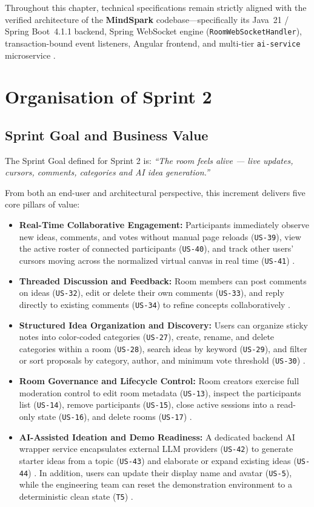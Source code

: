 Throughout this chapter, technical specifications remain strictly aligned with the verified architecture of the \textbf{MindSpark} codebase—specifically its Java~21 / Spring Boot~4.1.1 backend, Spring WebSocket engine (\texttt{RoomWebSocketHandler}), transaction-bound event listeners, Angular frontend, and multi-tier \texttt{ai-service} microservice \cite{backlog}.

\section{Organisation of Sprint 2}

\subsection{Sprint Goal and Business Value}

The Sprint Goal defined for Sprint 2 is: \emph{``The room feels alive — live updates, cursors, comments, categories and AI idea generation.''} \cite{backlog}

From both an end-user and architectural perspective, this increment delivers five core pillars of value:
\begin{itemize}
    \item \textbf{Real-Time Collaborative Engagement:} Participants immediately observe new ideas, comments, and votes without manual page reloads (\texttt{US-39}), view the active roster of connected participants (\texttt{US-40}), and track other users' cursors moving across the normalized virtual canvas in real time (\texttt{US-41}) \cite{backlog}.
    \item \textbf{Threaded Discussion and Feedback:} Room members can post comments on ideas (\texttt{US-32}), edit or delete their own comments (\texttt{US-33}), and reply directly to existing comments (\texttt{US-34}) to refine concepts collaboratively \cite{backlog}.
    \item \textbf{Structured Idea Organization and Discovery:} Users can organize sticky notes into color-coded categories (\texttt{US-27}), create, rename, and delete categories within a room (\texttt{US-28}), search ideas by keyword (\texttt{US-29}), and filter or sort proposals by category, author, and minimum vote threshold (\texttt{US-30}) \cite{backlog}.
    \item \textbf{Room Governance and Lifecycle Control:} Room creators exercise full moderation control to edit room metadata (\texttt{US-13}), inspect the participants list (\texttt{US-14}), remove participants (\texttt{US-15}), close active sessions into a read-only state (\texttt{US-16}), and delete rooms (\texttt{US-17}) \cite{backlog}.
    \item \textbf{AI-Assisted Ideation and Demo Readiness:} A dedicated backend AI wrapper service encapsulates external LLM providers (\texttt{US-42}) to generate starter ideas from a topic (\texttt{US-43}) and elaborate or expand existing ideas (\texttt{US-44}) \cite{backlog}. In addition, users can update their display name and avatar (\texttt{US-5}), while the engineering team can reset the demonstration environment to a deterministic clean state (\texttt{T5}) \cite{backlog}.
\end{itemize}

